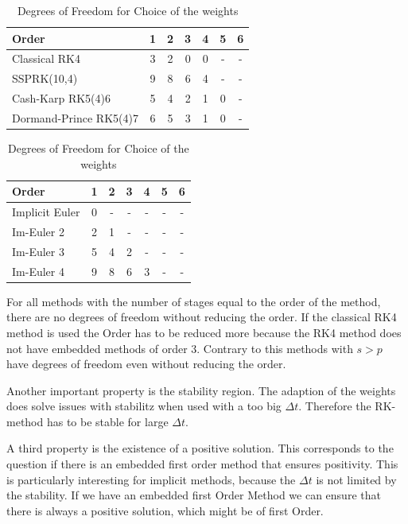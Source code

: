 \documentclass[a4paper]{scrartcl}
\numberwithin{equation}{section}
\theoremstyle{plain}
\theoremstyle{definition}
\numberwithin{theorem}{section}
\newcommand{\dt}{{\Delta t}}
\newcommand{\1}{\mathbbm{1}}
\begin{document}
\begin{table}[h!]
\centering    %
\begin{tabular}{|l |c c c c c c |} 
 \hline 
Order &1&2&3&4&5&6 \\ 
 \hline Classical RK4&3&2&0&0& - & -  \\ 
 SSPRK(10,4)&9&8&6&4& - & -  \\ 
 Cash-Karp RK5(4)6&5&4&2&1&0& -  \\ 
 Dormand-Prince RK5(4)7&6&5&3&1&0& -  \\ 
 \hline 
 \end{tabular}
 \caption{Degrees of Freedom for Choice of the weights} %
 \label{table:DOF_exp}
 \end{table}
 
 \begin{table}[h!]
\centering   %
 \begin{tabular}{|l |c c c c c c |} 
 \hline 
Order &1&2&3&4&5&6 \\ 
 \hline Implicit Euler&0& - & - & - & - & -  \\ 
 Im-Euler 2&2&1& - & - & - & -  \\ 
 Im-Euler 3&5&4&2& - & - & -  \\ 
 Im-Euler 4&9&8&6&3& - & -  \\ 
 \hline 
 \end{tabular}
 \caption{Degrees of Freedom for Choice of the weights} %
 \label{table:DOF_imp}
 \end{table}


For all methods with the number of stages equal to the order of the method, there are no degrees of freedom without reducing the order. 
If the classical RK4 method is used the Order has to be reduced more because the RK4 method does not have embedded methods of order 3.
Contrary to this methods with $s > p$ have degrees of freedom even without reducing the order. 

Another important property is the stability region. The adaption of the weights does solve issues with stabilitz when used with a too big $\dt$. Therefore the RK-method has to be stable for large $\dt$.


A third property is the existence of a positive solution. This corresponds to the question if there is an embedded first order method that ensures positivity. This is particularly interesting for implicit methods, because the $\dt$ is not limited by the stability. 
If we have an embedded first Order Method we can ensure that there is always a positive solution, which might be of first Order. 
\end{document}
